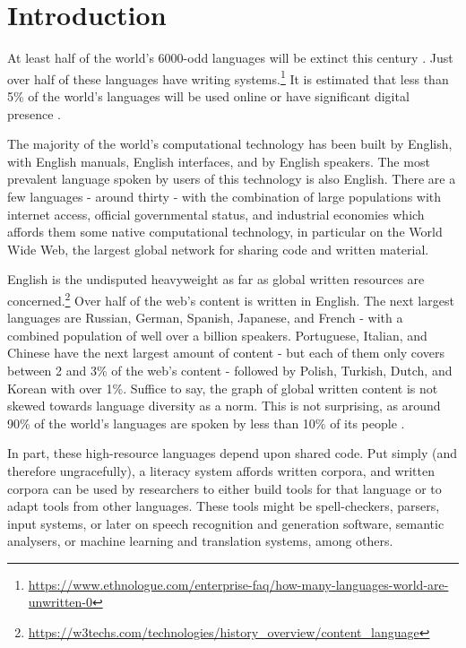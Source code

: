 \section{Introduction}\label{sec:intro}

At least half of the world's 6000-odd languages will be extinct this century \citep{krauss92, grenoble_2011}. Just over half of these languages have writing systems.\footnote{\href{https://www.ethnologue.com/enterprise-faq/how-many-languages-world-are-unwritten-0}{https://www.ethnologue.com/enterprise-faq/how-many-languages-world-are-unwritten-0}} It is estimated that less than 5\% of the world's languages will be used online or have significant digital presence \citep{kornai2013digital}. %

The majority of the world's computational technology has been built by English, with English manuals, English interfaces, and by English speakers. The most prevalent language spoken by users of this technology is also English. There are a few languages - around thirty - with the combination of large populations with internet access, official governmental status, and industrial economies which affords them some native computational technology, in particular on the World Wide Web, the largest global network for sharing code and written material.

English is the undisputed heavyweight as far as global written resources are concerned.\footnote{\href{https://w3techs.com/technologies/history\_overview/content\_language}{https://w3techs.com/technologies/history\_overview/content\_language}} Over half of the web's content is written in English. The next largest languages are Russian, German, Spanish, Japanese, and French - with a combined population of well over a billion speakers. Portuguese, Italian, and Chinese have the next largest amount of content - but each of them only covers between 2 and 3\% of the web's content - followed by Polish, Turkish, Dutch, and Korean with over 1\%. Suffice to say, the graph of global written content is not skewed towards language diversity as a norm. This is not surprising, as around 90\% of the world's languages are spoken by less than 10\% of its people \citep{bernard1992preserving}.

In part, these high-resource languages depend upon shared code. Put simply (and therefore ungracefully), a literacy system affords written corpora, and written corpora can be used by researchers to either build tools for that language or to adapt tools from other languages. These tools might be spell-checkers, parsers, input systems, or later on speech recognition and generation software, semantic analysers, or machine learning and translation systems, among others.

